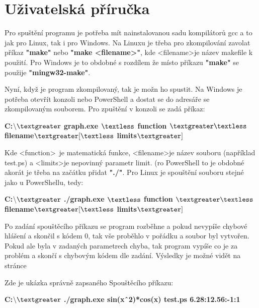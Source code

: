 \documentclass[../main.tex]{subfiles}
\begin{document}
\section{Uživatelská příručka}
Pro spuštění programu je potřeba mít nainstalovanou sadu kompilátorů gcc a to jak pro Linux, tak i pro Windows. Na Linuxu je třeba pro zkompilování zavolat příkaz \textbf{"make"} nebo \textbf{"make \textless filename\textgreater"}, kde \textless filename\textgreater je název makefile k použití. Pro Windows je to obdobné s rozdílem že místo příkazu \textbf{"make"} se použije \textbf{"mingw32-make"}.
\vspace{0.5em}

Nyní, když je program zkompilovaný, tak je možn ho spustit. Na Windows je potřeba otevřít konzoli nebo PowerShell a dostat se do adresáře se zkompilovaným souborem. Pro zpuštění v konzoli se zadá příkaz: \newline

\textbf{C:$\backslash\textgreater$ graph.exe $\textless$ function $\textgreater \textless$ filename$\textgreater[\textless$ limits$\textgreater]$}
\vspace{1em}

Kde \textless function\textgreater \ je matematická funkce, \textless filename\textgreater je název souboru (například test.ps) a \textless limits\textgreater je nepovinný parametr limit. (ro PowerShell to je obdobné akorát je třeba na začátku přidat \textbf{"./"}.
Pro Linux je spouštění souboru stejné jako u PowerShellu, tedy:
\vspace{1em}

\textbf{C:$\backslash\textgreater$ ./graph.exe $\textless$ function $\textgreater \textless$ filename$\textgreater[\textless$ limits$\textgreater]$}
\vspace{1em}

Po zadání spouštěcího příkazu se program rozběhne a pokud nevypíše chybové hlášení a skončil s kódem 0, tak vše proběhlo v pořádku a soubor byl vytvořen. Pokud ale byla v zadaných parametrech chyba, tak program vypíše co je za problém a skončí s chybovým kódem dle zadání. Výsledky je možné vidět na stránce \pageref{ref_images}
\vspace{0.5em}

Zde je ukázka správně zapsaného Spouštěcího příkazu:
\vspace{1em}

\textbf{C:$\backslash\textgreater$ ./graph.exe  sin(xˆ2)*cos(x) test.ps 6.28:12.56:-1:1}
\vspace{1em}
\end{document}
